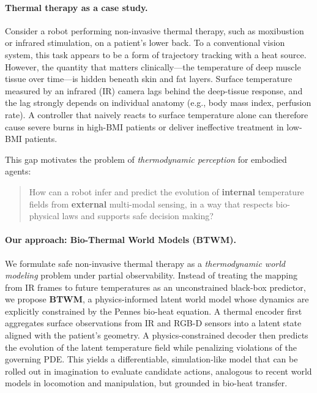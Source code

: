 \documentclass{article}
\begin{document}
\paragraph{Thermal therapy as a case study.}
Consider a robot performing non-invasive thermal therapy, such as moxibustion or infrared stimulation, on a patient's lower back. To a conventional vision system, this task appears to be a form of trajectory tracking with a heat source. However, the quantity that matters clinically---the temperature of deep muscle tissue over time---is hidden beneath skin and fat layers. Surface temperature measured by an infrared (IR) camera lags behind the deep-tissue response, and the lag strongly depends on individual anatomy (e.g., body mass index, perfusion rate). A controller that naively reacts to surface temperature alone can therefore cause severe burns in high-BMI patients or deliver ineffective treatment in low-BMI patients.

This gap motivates the problem of \emph{thermodynamic perception} for embodied agents:
\begin{quote}
How can a robot infer and predict the evolution of \textbf{internal} temperature fields from \textbf{external} multi-modal sensing, in a way that respects bio-physical laws and supports safe decision making?
\end{quote}

\paragraph{Our approach: Bio-Thermal World Models (BTWM).}
We formulate safe non-invasive thermal therapy as a \emph{thermodynamic world modeling} problem under partial observability. Instead of treating the mapping from IR frames to future temperatures as an unconstrained black-box predictor, we propose \textbf{BTWM}, a physics-informed latent world model whose dynamics are explicitly constrained by the Pennes bio-heat equation. A thermal encoder first aggregates surface observations from IR and RGB-D sensors into a latent state aligned with the patient's geometry. A physics-constrained decoder then predicts the evolution of the latent temperature field while penalizing violations of the governing PDE. This yields a differentiable, simulation-like model that can be rolled out in imagination to evaluate candidate actions, analogous to recent world models in locomotion and manipulation, but grounded in bio-heat transfer.
\end{document}
